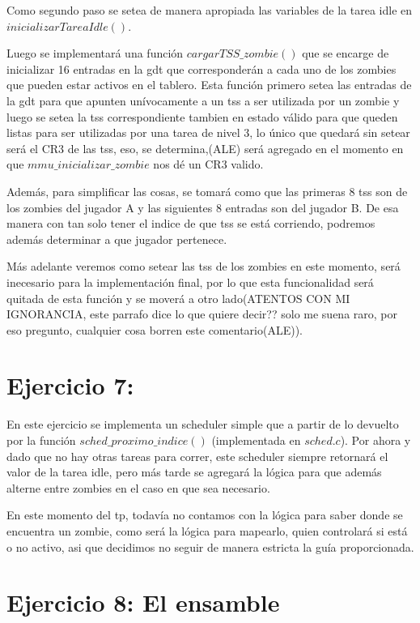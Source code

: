 \documentclass[a4paper]{article}
\begin{document}
Como segundo paso se setea de manera apropiada las variables de la tarea idle en $inicializarTareaIdle()$.

Luego se implementará una función $cargarTSS\_ zombie()$ que se encarge de inicializar 16 entradas en la gdt que corresponderán a cada uno de los zombies que pueden estar activos en el tablero. Esta función primero setea las entradas de la gdt para que apunten unívocamente a un tss a ser utilizada por un zombie y luego se setea la tss correspondiente tambien en estado válido para que queden listas para ser utilizadas por una tarea de nivel 3, lo único que quedará sin setear será el CR3 de las tss, eso, se determina,(ALE) será agregado en el momento en que $mmu\_ inicializar\_ zombie$ nos dé un CR3 valido.

Además, para simplificar las cosas, se tomará como que las primeras 8 tss son de los zombies del jugador A y las siguientes 8 entradas son del jugador B. De esa manera con tan solo tener el indice de que tss se está corriendo, podremos además determinar a que jugador pertenece.

Más adelante veremos como setear las tss de los zombies en este momento, será inecesario para la implementación final, por lo que esta funcionalidad será quitada de esta función y se moverá a otro lado(ATENTOS CON MI IGNORANCIA, este parrafo dice lo que quiere decir?? solo me suena raro, por eso pregunto, cualquier cosa borren este comentario(ALE)).

\section{Ejercicio 7:}

En este ejercicio se implementa un scheduler simple que a partir de lo devuelto por la función $sched\_ proximo\_ indice()$ (implementada en $sched.c$). Por ahora y dado que no hay otras tareas para correr, este scheduler siempre retornará el valor de la tarea idle, pero más tarde se agregará la lógica para que además alterne entre zombies en el caso en que sea necesario.

En este momento del tp, todavía no contamos con la lógica para saber donde se encuentra un zombie, como será la lógica para mapearlo, quien controlará si está o no activo, asi que decidimos no seguir de manera estricta la guía proporcionada.

\section{Ejercicio 8: El ensamble}
\end{document}
